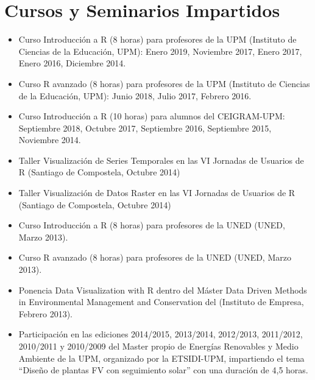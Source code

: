 \documentclass[article, a4paper]{memoir}
\begin{document}
\section{Cursos y Seminarios Impartidos}
\label{sec:org8263035}
\begin{itemize}
\item Curso \guillemotleft{}Introducción a R\guillemotright{} (8 horas) para profesores de la UPM (Instituto de Ciencias de la Educación, UPM):  Enero 2019, Noviembre 2017, Enero 2017, Enero 2016, Diciembre 2014.

\item Curso \guillemotleft{}R avanzado\guillemotright{} (8 horas) para profesores de la UPM (Instituto de Ciencias de la Educación, UPM): Junio 2018, Julio 2017, Febrero 2016.

\item Curso \guillemotleft{}Introducción a R\guillemotright{} (10 horas) para alumnos del CEIGRAM-UPM: Septiembre 2018, Octubre 2017, Septiembre 2016, Septiembre 2015, Noviembre 2014.

\item Taller \guillemotleft{}Visualización de Series Temporales\guillemotright{} en las VI Jornadas de Usuarios de R (Santiago de Compostela, Octubre 2014)

\item Taller \guillemotleft{}Visualización de Datos Raster\guillemotright{} en las VI Jornadas de Usuarios de R (Santiago de Compostela, Octubre 2014)

\item Curso \guillemotleft{}Introducción a R\guillemotright{} (8 horas) para profesores de la UNED (UNED, Marzo 2013).

\item Curso \guillemotleft{}R avanzado\guillemotright{} (8 horas) para profesores de la UNED (UNED, Marzo 2013).

\item Ponencia \guillemotleft{}Data Visualization with R\guillemotright{} dentro del Máster \guillemotleft{}Data Driven Methods in Environmental Management and Conservation\guillemotright{} del (Instituto de Empresa, Febrero 2013).

\item Participación en las ediciones 2014/2015, 2013/2014, 2012/2013, 2011/2012, 2010/2011 y 2010/2009 del Master propio de Energías Renovables y Medio Ambiente de la UPM, organizado por la ETSIDI-UPM, impartiendo el tema ``Diseño de plantas FV con seguimiento solar'' con una duración de 4,5 horas.


\end{itemize}
\end{document}
